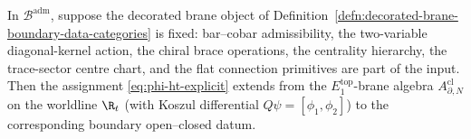 \begin{thm}
\label{thm:typed-boundary-open-closed-realisation}

In $\mathcal B^{\mathrm{adm}}$, suppose the decorated brane object of
Definition~\ref{defn:decorated-brane-boundary-data-categories} is fixed:
bar--cobar admissibility, the two-variable diagonal-kernel action,
the chiral brace operations, the centrality hierarchy, the trace-sector
centre chart, and the flat connection primitives are part of the
input.  Then the
assignment \eqref{eq:phi-ht-explicit} extends from the
$E_1^{\mathrm{top}}$-brane algebra
$A^{\mathrm{cl}}_{\partial,N}$ on the worldline $\R_t$ (with Koszul
differential $Q\psi=[\phi_1,\phi_2]$) to the corresponding boundary
open--closed datum.


\end{thm}
